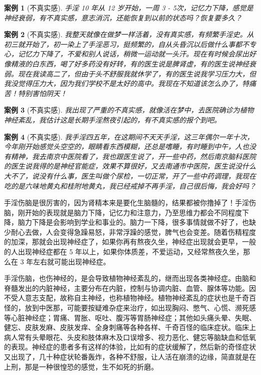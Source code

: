\documentclass{ctexart}
\newtheorem{case}{案例}
\begin{document}
\begin{case}[不真实感]
    手淫 10 年从 12 岁开始，一周 3 - 5次，记忆力下降，感觉是神经衰弱，有不真实感，意志消沉，还能恢复到以前的状态吗？恢复要多久？
\end{case}

\begin{case}[不真实感]
    我整天就像在做梦一样活着，没有真实感，有频繁手淫史。从初三就开始了，初一染上了手淫恶习，挺频繁的，自从头昏沉以后做什么事都不专心，记忆力下降了，不爱和别人说话，稍微一运动就一头汗。现在有时候会尿出好像精液的白东西，喝了好多药没有好转，有的医生说是脾肾虚，有的医生说神经衰弱。现在我读高二了，但由于头不舒服我就休学了，有的医生说我学习压力大，但我没觉得压力大，因为我们学校不是太好的高中。我现在不知道该怎么办了，特痛苦！特别害怕阴天！
\end{case}

\begin{case}[不真实感]
    我出现了严重的不真实感，就像活在梦中，去医院确诊为植物神经紊乱，我估计这是长期手淫熬夜引起的，有不真实感的报个到吧。
\end{case}

\begin{case}[不真实感]
    我手淫四五年，在这期间不天天手淫，这三年偶尔一年十次，今年刚开始感觉头空空的，眼睛看东西模糊，还总是嗜睡，有时睡到中午，人也没有精神，我去南京中医院看了，我也跟医生说了，开一些中药，然后南京脑科医院的医生说我得的是神经官能症，效果不算很好，又去南通市中医院，医生说没什么大不了，说没有什么事，医生叫做个尿检，一切正常，开了一些中药调理，我现在吃的是六味地黄丸和桂附地黄丸，我已经戒掉不再手淫，自己很后悔，我会好吗？
\end{case}

手淫伤脑是很厉害的，因为肾精本来是要化生脑髓的，结果都被你撸掉了！手淫伤脑，刚开始的表现就是脑力下降，记忆力和注意力，乃至思维力都会不同程度下降，脑力下降是会影响到学业和事业的。脑力一下降，很多事情就做不好了，也缺少耐心去做，人会变得急躁易怒，非常浮躁的感觉，脾气也会变差。随着伤精程度的加深，那就会出现神经症了，如果你再有熬夜久坐，神经症出现就会更早，一般的人出现神经症都在 5 年以上，如果你体质差，不爱运动，又经常熬夜久坐，那么在 3 年左右就可能出现神经症。

手淫伤脑，也伤神经的，是会导致植物神经紊乱的，继而出现各类神经症。由脑和脊髓发出的内脏神经，主要分布在内脏，控制与协调内脏、血管、腺体等功能。因不受人意志支配，故称自主神经，也称植物神经。植物神经紊乱的症状也是千奇百怪的，放到中医那，可能要按疑难杂症来治疗，如出现胸闷、憋气、心慌、濒死感等心脏神经症；胃痛、胃胀、呕吐、腹泻等胃肠神经症；其他如头痛头晕、失眠、健忘、皮肤发麻、皮肤发痒、全身刺痛等各种各样、千奇百怪的临床症状。临床上病人常有头晕眼花、头皮和肢体麻木及口误增多、视力恶化、健忘等脑缺血和低氧的表现。神经症的患者多有这样的体验，比如有的症状缓解了，然后新的奇怪症状又出现了，几十种症状轮番轰炸，各种不舒服，让人活在崩溃的边缘，简直就是在上刑，那是一种很惶恐的感觉，生不如死的折磨。
\end{document}
